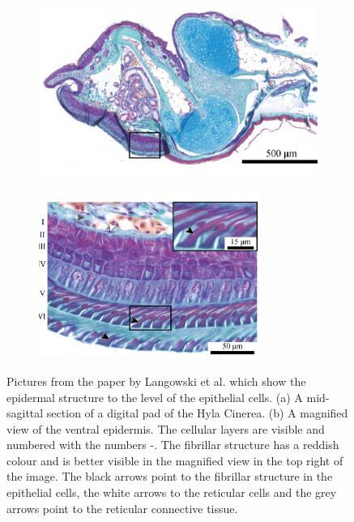 \begin{figure}[h!]
     \begin{subfigure}{0.45\textwidth}
         \centering
         \includegraphics[width=\linewidth, height=5.5cm, angle=0]{images/epidermal structure/epidermis_langowski_1.png}
         \caption{}
         \label{fig:toe_pad_section}
     \end{subfigure}
     \hfill
     \begin{subfigure}{0.45\textwidth}
         \centering
         \includegraphics[width=\linewidth, height=5.5cm, angle=0]{images/epidermal structure/epidermis_langowski_2.png}
         \caption{}
         \label{fig:epidermis_different_levels}
     \end{subfigure}
     \hfill
    \caption{Pictures from the paper by Langowski et al. \cite{langowski2018force} which show the epidermal structure to the level of the epithelial cells. (a) A mid-sagittal section of a digital pad of the Hyla Cinerea. (b) A magnified view of the ventral epidermis. The cellular layers are visible and numbered with the numbers -. The fibrillar structure has a reddish colour and is better visible in the magnified view in the top right of the image. The black arrows point to the fibrillar structure in the epithelial cells, the white arrows to the reticular cells and the grey arrows point to the reticular connective tissue.}
    \label{fig:epidermal_structures_all}
\end{figure}


